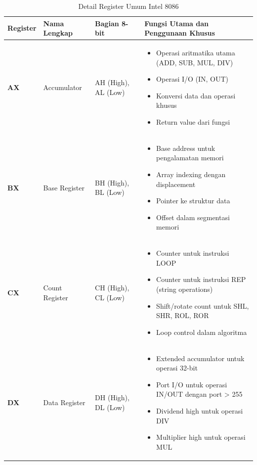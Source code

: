 \documentclass[../main.tex]{subfiles}
\begin{document}
\begin{table}[h]
\centering
\caption{Detail Register Umum Intel 8086}
\begin{tabular}{|p{2cm}|p{3cm}|p{4cm}|p{6cm}|}
\hline
\textbf{Register} & \textbf{Nama Lengkap} & \textbf{Bagian 8-bit} & \textbf{Fungsi Utama dan Penggunaan Khusus} \\
\hline
\textbf{AX} & Accumulator & AH (High), AL (Low) & \begin{itemize}
\item Operasi aritmatika utama (ADD, SUB, MUL, DIV)
\item Operasi I/O (IN, OUT)
\item Konversi data dan operasi khusus
\item Return value dari fungsi
\end{itemize} \\
\hline
\textbf{BX} & Base Register & BH (High), BL (Low) & \begin{itemize}
\item Base address untuk pengalamatan memori
\item Array indexing dengan displacement
\item Pointer ke struktur data
\item Offset dalam segmentasi memori
\end{itemize} \\
\hline
\textbf{CX} & Count Register & CH (High), CL (Low) & \begin{itemize}
\item Counter untuk instruksi LOOP
\item Counter untuk instruksi REP (string operations)
\item Shift/rotate count untuk SHL, SHR, ROL, ROR
\item Loop control dalam algoritma
\end{itemize} \\
\hline
\textbf{DX} & Data Register & DH (High), DL (Low) & \begin{itemize}
\item Extended accumulator untuk operasi 32-bit
\item Port I/O untuk operasi IN/OUT dengan port > 255
\item Dividend high untuk operasi DIV
\item Multiplier high untuk operasi MUL
\end{itemize} \\
\hline
\end{tabular}
\label{tab:general-registers-detail}
\end{table}
\end{document}
